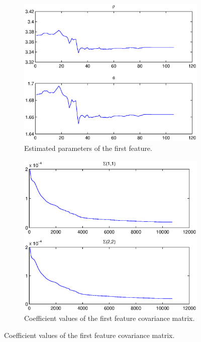 \documentclass[a4paper,12pt]{article}
\begin{document}
\begin{figure}
        \begin{subfigure}[t]{0.45\textwidth}
                \includegraphics[width=\textwidth]{noerr_f1_mu}
                \caption{Estimated parameters of the first feature.}
                \label{fig:noerr_fi_mu}
        \end{subfigure}
        \begin{subfigure}[t]{0.45\textwidth}
                \includegraphics[width=\textwidth]{noerr_f1_sig}
                \caption{Coefficient values of the first feature covariance matrix.}
                \label{fig:noerr_fi_sig}
        \end{subfigure}
        

\end{figure}
\end{document}

